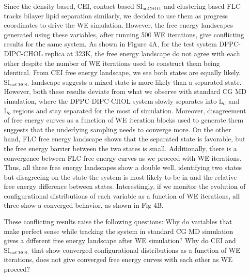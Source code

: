 \documentclass{biophys-new}
\begin{document}
Since the density based, CEI, contact-based $\text{SI}_{\text{noCHOL}}$ and clustering based FLC tracks bilayer lipid separation similarly,
we decided to use them as progress coordinates to drive the WE simulation.
However, the free energy landscapes generated using these variables, after running 500 WE iterations, give conflicting results for the same system.
As shown in Figure 4A, for the test system DPPC-DIPC-CHOL replica at 323K, the free energy landscape do not agree with each other despite the number of WE iterations used to construct them being identical.
From CEI free energy landscape, we see both states are equally likely.
$\text{SI}_{\text{noCHOL}}$ landscape suggests a mixed state is more likely than a separated state.
However, both these results deviate from what we observe with standard CG MD simulation,
where the DPPC-DIPC-CHOL system slowly separates into $\text{L}_{\text{d}}$ and $\text{L}_{\text{o}}$ regions and stay separated for the most of simulation.
Moreover, disagreement of free energy curves as a function of WE iteration blocks used to generate them suggests that the underlying sampling needs to converge more.
On the other hand, FLC free energy landscape shows that the separated state is favorable, but the free energy barrier between the two states is small.
Additionally, there is a convergence between FLC free energy curves as we proceed with WE iterations.
Thus, all three free energy landscapes show a double well, identifying two states but disagreeing on the state the system is most likely to be in and the relative free energy difference between states.
Interestingly, if we monitor the evolution of configurational distributions of each variable as a function of WE iterations, all three show a converged behavior, as shown in Fig 4B.

These conflicting results raise the following questions: Why do variables that make perfect sense while tracking the system in standard CG MD simulation gives a different free energy landscape after WE simulation?
Why do CEI and $\text{SI}_{\text{noCHOL}}$ that show converged configurational distributions as a function of WE iterations, does not give converged free energy curves with each other as WE proceed?
\end{document}
